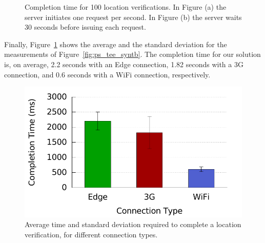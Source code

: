 \begin{figure}[!ht]
  \centering
  
  \caption[Completion time for 100 location verifications]{Completion time for
  100 location verifications. In Figure (a) the server initiates one request
  per second. In Figure (b) the server waits 30 seconds before issuing each
  request.}
\end{figure}

Finally, Figure~\ref{fig:ps_tee_syntc} shows the average and the standard
deviation for the measurements of Figure~\ref{fig:ps_tee_syntb}. The completion
time for our solution is, on average, 2.2 seconds with an Edge connection, 1.82
seconds with a 3G connection, and 0.6 seconds with a WiFi connection,
respectively.

\begin{figure}[!ht]
  \centering
  \includegraphics[width=.6\linewidth]{figures/phonesecures/tee_server_overview.pdf}
  \caption[Average time and standard deviation required to complete a location
  verification]{Average time and standard deviation required to complete a location
  verification, for different connection types.}
  \label{fig:ps_tee_syntc}
\end{figure}

